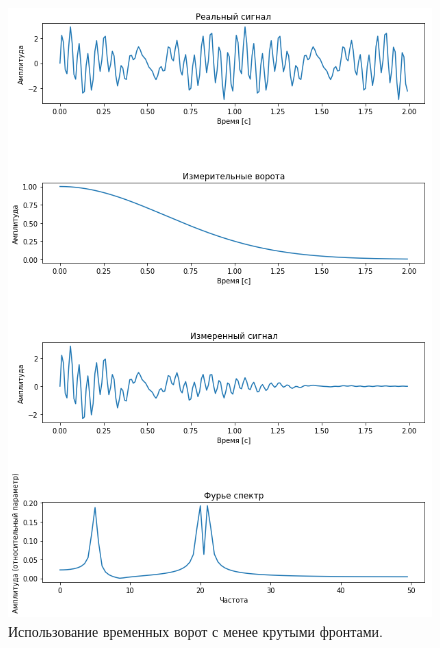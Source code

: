 \begin{figure}
    \centering
    \includegraphics[scale = 0.5]{Pictures/separation_gaus.png}
    \caption{Использование временных ворот с менее крутыми фронтами.}
    \label{fig:gaus_separation}
\end{figure}
